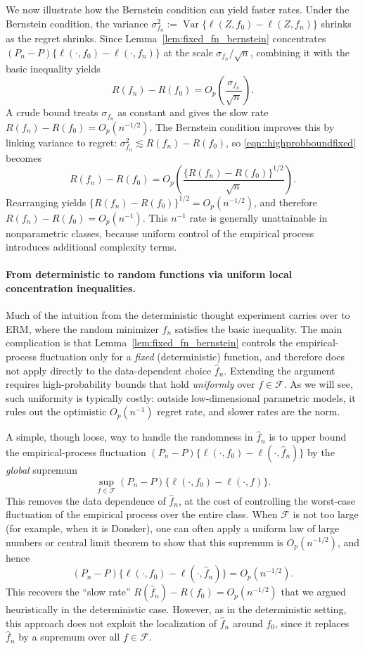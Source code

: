 \documentclass[11pt]{article}
\theoremstyle{plain}
\theoremstyle{definition} %
\newcommand{\Var}{\operatorname{Var}}
\begin{document}
We now illustrate how the Bernstein condition can yield faster rates. Under the
Bernstein condition, the variance
\(\sigma_{f_n}^2:=\Var\{\ell(Z,f_0)-\ell(Z,f_n)\}\) shrinks as the regret shrinks.
Since Lemma~\ref{lem:fixed_fn_bernstein} concentrates
\((P_n-P)\{\ell(\cdot,f_0)-\ell(\cdot,f_n)\}\) at the scale \(\sigma_{f_n}/\sqrt{n}\),
combining it with the basic inequality yields
\begin{equation}
\label{eqn::highprobboundfixed}
R(f_n)-R(f_0)=O_p\left(\frac{\sigma_{f_n}}{\sqrt{n}}\right).
\end{equation}
A crude bound treats \(\sigma_{f_n}\) as constant and gives the slow rate
\(R(f_n)-R(f_0)=O_p(n^{-1/2})\). The Bernstein condition improves this by
linking variance to regret: \(\sigma_{f_n}^2\lesssim R(f_n)-R(f_0)\), so
\eqref{eqn::highprobboundfixed} becomes
\[
R(f_n)-R(f_0)
=
O_p\left(\frac{\{R(f_n)-R(f_0)\}^{1/2}}{\sqrt{n}}\right).
\]
Rearranging yields \(\{R(f_n)-R(f_0)\}^{1/2}=O_p(n^{-1/2})\), and therefore
\(R(f_n)-R(f_0)=O_p(n^{-1})\).
This \(n^{-1}\) rate is generally unattainable in nonparametric classes, because
uniform control of the empirical process introduces additional complexity terms.

\paragraph{From deterministic to random functions via uniform local concentration inequalities.}
Much of the intuition from the deterministic thought experiment carries over to ERM, where the random minimizer \(\hat f_n\) satisfies the basic inequality.
The main complication is that Lemma~\ref{lem:fixed_fn_bernstein} controls the empirical-process fluctuation only for a \emph{fixed} (deterministic) function, and therefore does not apply directly to the data-dependent choice \(\hat f_n\).
Extending the argument requires high-probability bounds that hold \emph{uniformly} over \(f\in\mathcal F\).
As we will see, such uniformity is typically costly: outside low-dimensional parametric models, it rules out the optimistic \(O_p(n^{-1})\) regret rate, and slower rates are the norm.

A simple, though loose, way to handle the randomness in \(\hat f_n\) is to upper bound the empirical-process fluctuation \((P_n-P)\{\ell(\cdot,f_0)-\ell(\cdot,\hat f_n)\}\) by the \emph{global} supremum
\[
\sup_{f \in \mathcal{F}} (P_n - P)\{\ell(\cdot,f_0)-\ell(\cdot,f)\}.
\]
This removes the data dependence of \(\hat f_n\), at the cost of controlling the worst-case fluctuation of the empirical process over the entire class.
When \(\mathcal{F}\) is not too large (for example, when it is Donsker), one can often apply a uniform law of large numbers or central limit theorem \citep{van1996weak} to show that this supremum is \(O_p(n^{-1/2})\), and hence
\[
(P_n-P)\{\ell(\cdot,f_0)-\ell(\cdot,\hat f_n)\}=O_p(n^{-1/2}).
\]
This recovers the ``slow rate'' \(R(\hat f_n)-R(f_0)=O_p(n^{-1/2})\) that we argued heuristically in the deterministic case.
However, as in the deterministic setting, this approach does not exploit the localization of \(\hat f_n\) around \(f_0\), since it replaces \(\hat f_n\) by a supremum over all \(f \in \mathcal{F}\).
\end{document}
